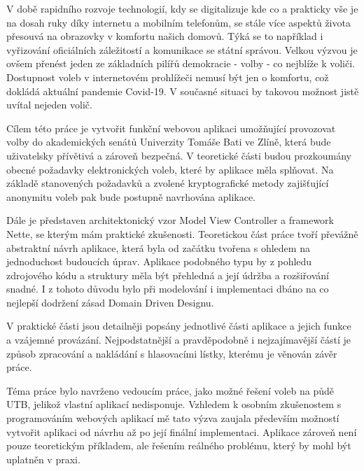 
V době rapidního rozvoje technologií, kdy se digitalizuje kde co a prakticky vše je na dosah ruky díky internetu a mobilním telefonům, se stále více aspektů života přesouvá na obrazovky v komfortu našich domovů. Týká se to například i vyřizování oficiálních záležitostí a komunikace se státní správou. Velkou výzvou je ovšem přenést jeden ze základních pilířů demokracie - volby - co nejblíže k voliči. Dostupnost voleb v internetovém prohlížeči nemusí být jen o komfortu, což dokládá aktuální pandemie Covid-19. V současné situaci by takovou možnost jistě uvítal nejeden volič.

Cílem této práce je vytvořit funkční webovou aplikaci umožňující provozovat volby do akademických senátů Univerzity Tomáše Bati ve Zlíně, která bude uživatelsky přívětivá a zároveň bezpečná. V teoretické části budou prozkoumány obecné požadavky elektronických voleb, které by aplikace měla splňovat. Na základě stanovených požadavků a zvolené kryptografické metody zajišťující anonymitu voleb pak bude postupně navrhována aplikace.

Dále je představen architektonický vzor Model View Controller a framework Nette, se kterým mám praktické zkušenosti. Teoretickou část práce tvoří převážně abstraktní návrh aplikace, která byla od začátku tvořena s ohledem na jednoduchost budoucích úprav. Aplikace podobného typu by z pohledu zdrojového kódu a struktury měla být přehledná a její údržba a rozšiřování snadné. I z tohoto důvodu bylo při modelování i implementaci dbáno na co nejlepší dodržení zásad Domain Driven Designu.

V praktické části jsou detailněji popsány jednotlivé části aplikace a jejich funkce a vzájemné provázání. Nejpodstatnější a pravděpodobně i nejzajímavější částí je způsob zpracování a nakládání s hlasovacími lístky, kterému je věnován závěr práce.

Téma práce bylo navrženo vedoucím práce, jako možné řešení voleb na půdě UTB, jelikož vlastní aplikací nedisponuje. Vzhledem k osobním zkušenostem s programováním webových aplikací mě tato výzva zaujala především možností vytvořit aplikaci od návrhu až po její finální implementaci. Aplikace zároveň není pouze teoretickým příkladem, ale řešením reálného problému, který by mohl být uplatněn v praxi.

